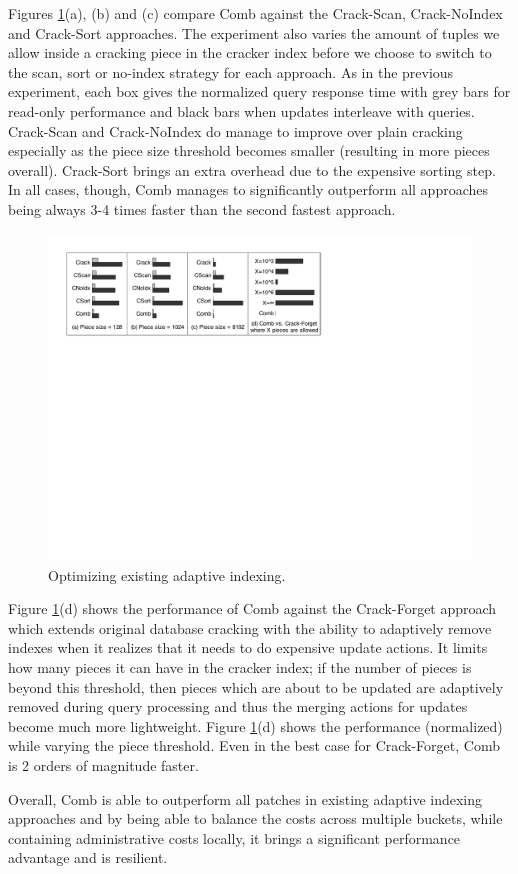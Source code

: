 Figures \ref{F:SimpleApproaches}(a), (b) and (c) compare Comb against the Crack-Scan, Crack-NoIndex and Crack-Sort approaches.
The experiment also varies the amount of tuples we allow inside a cracking piece in the cracker index before we choose to switch 
to the scan, sort or no-index strategy for each approach. 
As in the previous experiment, each box gives the normalized query response time
with grey bars for read-only performance
and black bars when updates interleave with queries.
Crack-Scan and Crack-NoIndex do manage to improve over plain cracking especially as the piece size threshold
becomes smaller (resulting in more pieces overall). Crack-Sort brings an extra overhead due to the expensive sorting step. 
In all cases, though, Comb manages to significantly outperform all approaches	being always 3-4 times faster than 
the second fastest approach.  


\begin{figure}[t]
\includegraphics[width=\columnwidth]{graphs/fig_simple_w_crake.pdf}%
\vspace{-1em}%
\caption{Optimizing existing adaptive indexing.}
\vspace{-1em}%
\label{F:SimpleApproaches}
\end{figure}

Figure \ref{F:SimpleApproaches}(d) shows the performance of Comb against the Crack-Forget approach
which extends original database cracking with the ability to adaptively remove indexes
when it realizes that it needs to do expensive update actions.
It limits how many pieces it can have in the cracker index;
if the number of pieces is beyond this threshold, then  pieces which are about to be updated
are adaptively removed during query processing and thus the merging actions for updates become much more lightweight.
Figure \ref{F:SimpleApproaches}(d) shows the performance (normalized) while varying the piece threshold.
Even in the best case for Crack-Forget, Comb is 2 orders of magnitude faster.

Overall, Comb is able to outperform all patches in existing adaptive indexing approaches
and by being able to balance the costs across multiple buckets, while containing
administrative costs locally, it brings a significant performance advantage and is resilient.

 
